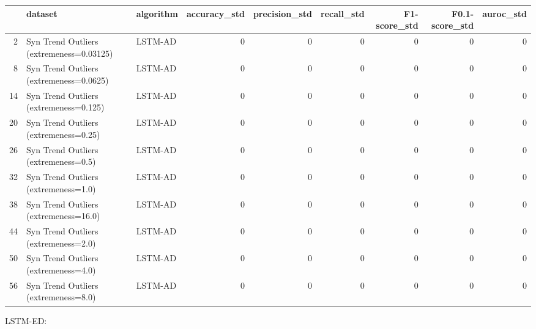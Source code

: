 \begin{tabular}{rllrrrrrr}
\hline
    & dataset                                  & algorithm   &   accuracy\_std &   precision\_std &   recall\_std &   F1-score\_std &   F0.1-score\_std &   auroc\_std \\
\hline
  2 & Syn Trend Outliers (extremeness=0.03125) & LSTM-AD     &              0 &               0 &            0 &              0 &                0 &           0 \\
  8 & Syn Trend Outliers (extremeness=0.0625)  & LSTM-AD     &              0 &               0 &            0 &              0 &                0 &           0 \\
 14 & Syn Trend Outliers (extremeness=0.125)   & LSTM-AD     &              0 &               0 &            0 &              0 &                0 &           0 \\
 20 & Syn Trend Outliers (extremeness=0.25)    & LSTM-AD     &              0 &               0 &            0 &              0 &                0 &           0 \\
 26 & Syn Trend Outliers (extremeness=0.5)     & LSTM-AD     &              0 &               0 &            0 &              0 &                0 &           0 \\
 32 & Syn Trend Outliers (extremeness=1.0)     & LSTM-AD     &              0 &               0 &            0 &              0 &                0 &           0 \\
 38 & Syn Trend Outliers (extremeness=16.0)    & LSTM-AD     &              0 &               0 &            0 &              0 &                0 &           0 \\
 44 & Syn Trend Outliers (extremeness=2.0)     & LSTM-AD     &              0 &               0 &            0 &              0 &                0 &           0 \\
 50 & Syn Trend Outliers (extremeness=4.0)     & LSTM-AD     &              0 &               0 &            0 &              0 &                0 &           0 \\
 56 & Syn Trend Outliers (extremeness=8.0)     & LSTM-AD     &              0 &               0 &            0 &              0 &                0 &           0 \\
\hline
\end{tabular}

LSTM-ED:

